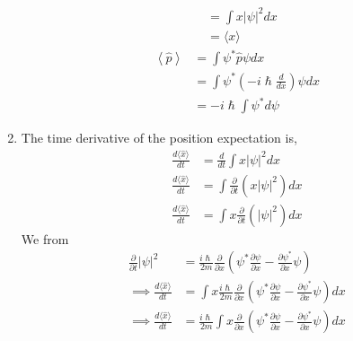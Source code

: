 \documentclass[addpoints]{exam}
\theoremstyle{mytheoremstyle}
\theoremstyle{mytheoremstyle}
\theoremstyle{myproblemstyle}
\begin{document}
\begin{questions}
\begin{solution}
\begin{enumerate}
\begin{equation*}
\begin{aligned}
					                                       & = \int x|\psi|^2                dx \\
					                                       & = \langle x\rangle
				      \end{aligned}
			      \end{equation*}
			      \begin{equation*}
				      \begin{aligned}
					      \left\langle\hat{p}\right\rangle & = \int \psi^{*}\hat{p}\psi                            dx \\
					                                       & = \int \psi^{*}\left(-i\hslash\frac{d}{dx}\right)\psi dx \\
					                                       & = -i\hslash\int \psi^{*} d\psi
				      \end{aligned}
			      \end{equation*}
			\item The time derivative of the position expectation is,
			      \begin{equation*}
				      \begin{aligned}
					      \frac{d\langle\hat{x}\rangle}{dt} & = \frac{d}{dt}\int x|\psi|^2                             dx \\
					      \frac{d\langle\hat{x}\rangle}{dt} & = \int \frac{\partial}{\partial t}\left(x|\psi|^2\right) dx \\
					      \frac{d\langle\hat{x}\rangle}{dt} & = \int x\frac{\partial}{\partial t}\left(|\psi|^2\right)dx
				      \end{aligned}
			      \end{equation*}
			      We from \cite{DavidJ.Griffiths:2005:IntroductiontoQuantumMechanics}
			      \begin{equation*}
				      \begin{aligned}
					      \frac{\partial}{\partial t}|\psi|^2        & = \frac{i\hslash}{2m}\frac{\partial}{\partial x}\left(\psi^{*}\frac{\partial\psi}{\partial x}-\frac{\partial\psi^{*}}{\partial x}\psi\right)          \\
					      \implies \frac{d\langle\hat{x}\rangle}{dt} & = \int x\frac{i\hslash}{2m}\frac{\partial}{\partial x}\left(\psi^{*}\frac{\partial\psi}{\partial x}-\frac{\partial\psi^{*}}{\partial x}\psi\right) dx \\
					      \implies \frac{d\langle\hat{x}\rangle}{dt} & = \frac{i\hslash}{2m}\int x\frac{\partial}{\partial x}\left(\psi^{*}\frac{\partial\psi}{\partial x}-\frac{\partial\psi^{*}}{\partial x}\psi\right) dx \\

\end{aligned}
\end{equation*}
\end{enumerate}
\end{solution}
\end{questions}
\end{document}
